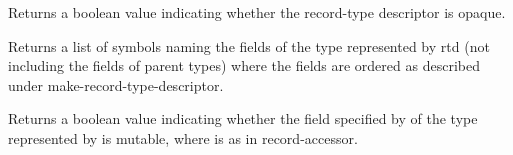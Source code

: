 \begin{entry}{%
}
   
Returns a boolean value indicating whether the record-type descriptor is
opaque.
\end{entry}

\begin{entry}{%
}
   
Returns a list of symbols naming the fields of the type represented by rtd
(not including the fields of parent types) where the fields are ordered as
described under {\cf make-record-type-descriptor}.
\end{entry}

\begin{entry}{%
}
   
Returns a boolean value indicating whether the field specified by
 of the type represented by  is mutable, where 
is as in {\cf record-accessor}.
\end{entry}


